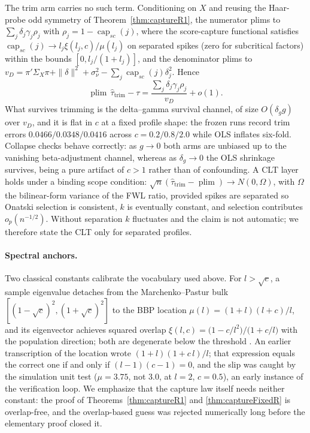 The trim arm carries no such term. Conditioning on $X$ and reusing the Haar-probe odd symmetry of Theorem~\ref{thm:captureR1}, the numerator plims to $\sum_j\delta_j\gamma_j\rho_j$ with $\rho_j=1-\operatorname{cap}_{sc}(j)$, where the score-capture functional satisfies $\operatorname{cap}_{sc}(j)\to l_j\xi(l_j,c)/\mu(l_j)$ on separated spikes (zero for subcritical factors) within the bounds $[0,l_j/(1+l_j)]$, and the denominator plims to $v_D=\pi'\Sigma_X\pi+\|\delta\|^2+\sigma_\nu^2-\sum_j\operatorname{cap}_{sc}(j)\delta_j^2$. Hence
\[
\operatorname{plim}\,\hat\tau_{\mathrm{trim}}-\tau
=\frac{\sum_j\delta_j\gamma_j\rho_j}{v_D}+o(1).
\]
What survives trimming is the delta--gamma survival channel, of size $O(\delta_g g)$ over $v_D$, and it is flat in $c$ at a fixed profile shape: the frozen runs record trim errors $0.0466/0.0348/0.0416$ across $c=0.2/0.8/2.0$ while OLS inflates six-fold. Collapse checks behave correctly: as $g\to 0$ both arms are unbiased up to the vanishing beta-adjustment channel, whereas as $\delta_g\to 0$ the OLS shrinkage survives, being a pure artifact of $c>1$ rather than of confounding. A CLT layer holds under a binding scope condition: $\sqrt n(\hat\tau_{\mathrm{trim}}-\operatorname{plim})\to N(0,\Omega)$, with $\Omega$ the bilinear-form variance of the FWL ratio, provided spikes are separated so Onatski selection is consistent, $k$ is eventually constant, and selection contributes $o_p(n^{-1/2})$. Without separation $k$ fluctuates and the claim is not automatic; we therefore state the CLT only for separated profiles.

\paragraph{Spectral anchors.}
Two classical constants calibrate the vocabulary used above. For $l>\sqrt c$, a sample eigenvalue detaches from the Marchenko--Pastur bulk $[(1-\sqrt c)^2,(1+\sqrt c)^2]$ to the BBP location
$\mu(l)=(1+l)(l+c)/l$,
and its eigenvector achieves squared overlap
$\xi(l,c)=\bigl(1-c/l^2\bigr)/\bigl(1+c/l\bigr)$
with the population direction; both are degenerate below the threshold \citep{bbp2005phase,benaychgeorges2011eigenvalues}. An earlier transcription of the location wrote $(1+l)(1+c\,l)/l$; that expression equals the correct one if and only if $(l-1)(c-1)=0$, and the slip was caught by the simulation unit test ($\mu=3.75$, not $3.0$, at $l=2$, $c=0.5$), an early instance of the verification loop. We emphasize that the capture law itself needs neither constant: the proof of Theorems~\ref{thm:captureR1} and \ref{thm:captureFixedR} is overlap-free, and the overlap-based guess was rejected numerically long before the elementary proof closed it.

